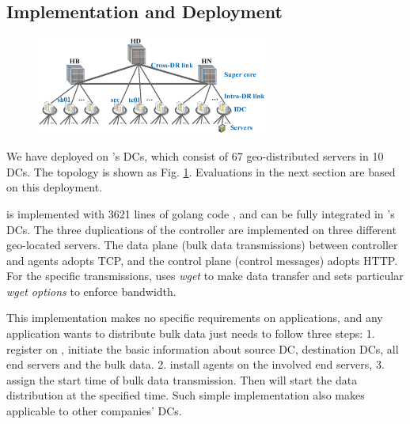 \subsection{Implementation and Deployment}
\label{sec:deployment}

\begin{figure}[t]
  \centering
  \includegraphics[width=3in]{images/Testbed_v2.eps}
  \label{fig:topology}
\vspace{-0.1in}
\end{figure}

We have deployed \name on \company's DCs, which consist of 67 geo-distributed servers in 10 DCs. The topology is shown as Fig. \ref{fig:topology}. Evaluations in the next section are based on this deployment.

\name is implemented with 3621 lines of golang code \cite{golang}, and can be fully integrated in \company's DCs. The three duplications of the controller are implemented on three different geo-located servers. The data plane (bulk data transmissions) between controller and agents adopts TCP, and the control plane (control messages) adopts HTTP. For the specific transmissions, \name uses \emph{wget} to make data transfer and sets particular \emph{wget options} to enforce bandwidth.

This implementation makes no specific requirements on applications, and any application wants to distribute bulk data just needs to follow three steps: 1. register on \name, initiate the basic information about source DC, destination DCs, all end servers and the bulk data. 2. install agents on the involved end servers, 3. assign the start time of bulk data transmission. Then \name will start the data distribution at the specified time. Such simple implementation also makes \name applicable to other companies' DCs. 	



